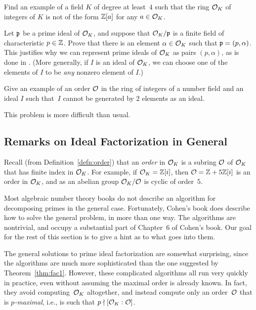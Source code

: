 \begin{exercise}
	Find an example of a field $K$ of degree at least~$4$ such that the ring
	$\mathcal{O}_K$ of integers of $K$ is not of the form $\mathbb{Z}[a]$ for any $a\in \mathcal{O}_K$.
\end{exercise}

\begin{exercise}
	Let $\mathfrak{p}$ be a prime ideal of $\mathcal{O}_K$, and suppose that $\mathcal{O}_K/\mathfrak{p}$
	is a finite field of characteristic $p\in\mathbb{Z}$.  Prove that there is
	an element $\alpha\in\mathcal{O}_K$ such that $\mathfrak{p}=(p,\alpha)$.  This
	justifies why we can represent prime ideals of $\mathcal{O}_K$ as pairs
	$(p,\alpha)$, as is done in \sage. (More generally, if $I$ is an
	ideal of $\mathcal{O}_K$, we can choose one of the elements of $I$ to be {\em
	any} nonzero element of $I$.)
\end{exercise}

\begin{exercise}
	Give an example of an order $\mathcal{O}$ in the ring of integers of
	a number field and an ideal $I$ such that~$I$ cannot be generated by
	$2$ elements as an ideal.

	\begin{hint}
		This problem is more difficult than usual.
	\end{hint}
\end{exercise}

\subsection{Remarks on Ideal Factorization in General}

Recall (from Definition~\ref{defn:order}) that an {\em order} in $\mathcal{O}_K$ is
a subring $\mathcal{O}$ of $\mathcal{O}_K$ that has finite index in $\mathcal{O}_K$.  For
example, if $\mathcal{O}_K = \mathbb{Z}[i]$, then $\mathcal{O} = \mathbb{Z} + 5\mathbb{Z}[i]$ is an order in $\mathcal{O}_K$,
and as an abelian group $\mathcal{O}_K/\mathcal{O}$ is cyclic of order~$5$.

Most algebraic number theory books do not describe an algorithm for
decomposing primes in the general case.  Fortunately, Cohen's book
\cite[Ch.~6]{cohen:course_ant} does describe how to solve the general
problem, in more than one way.  The algorithms are nontrivial, and
occupy a substantial part of Chapter~6 of Cohen's book.  Our goal
for the rest of this section is to give a hint as to what goes into them.

The general solutions to prime ideal factorization are somewhat surprising,
since the algorithms are much more sophisticated than the one
suggested by Theorem~\ref{thm:fac1}.  However, these complicated
algorithms all run very quickly in practice, even without assuming the
maximal order is already known.  In fact, they avoid computing~$\mathcal{O}_K$
altogether, and instead compute only an order~$\mathcal{O}$ that is {\em $p$-maximal},
i.e., is such that $p \nmid [\mathcal{O}_K:\mathcal{O}]$.

